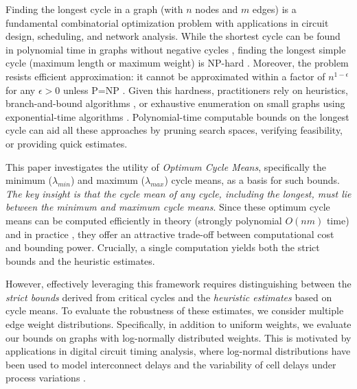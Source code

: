 \documentclass{article}
\theoremstyle{definition}
\begin{document}
Finding the longest cycle in a graph (with $n$ nodes and $m$ edges) is
a fundamental combinatorial optimization problem with applications in
circuit design, scheduling, and network analysis. While the shortest
cycle can be found in polynomial time in graphs without negative
cycles \citep{OrSe2017}, finding the
longest simple cycle (maximum length or maximum weight) is NP-hard
\citep{Ga79}. Moreover, the problem resists efficient approximation:
it cannot be approximated within a factor of $n^{1-\epsilon}$ for any
$\epsilon > 0$ unless P=NP \citep{BjHuKh04}. Given this hardness,
practitioners rely on heuristics, branch-and-bound algorithms
\citep{MoJaSaSe16,StPuFe14,CoStFe20}, or exhaustive enumeration on
small graphs using exponential-time algorithms
\citep{Jo75,HaJa08,BaSa25}. Polynomial-time computable bounds on the
longest cycle can aid all these approaches by pruning search spaces,
verifying feasibility, or providing quick estimates.

This paper investigates the utility of \textit{Optimum Cycle Means},
specifically the minimum ($\lambda_{min}$) and maximum
($\lambda_{max}$) cycle means, as a basis for such bounds. \textit{The
  key insight is that the cycle mean of any cycle, including the
  longest, must lie between the minimum and maximum cycle
  means}. Since these optimum cycle means can be computed efficiently
in theory (strongly polynomial $O(nm)$ time) and in practice
\citep{Da04}, they offer an attractive trade-off between computational
cost and bounding power. Crucially, a single computation yields both
the strict bounds and the heuristic estimates.

However, effectively leveraging this framework requires distinguishing
between the \textit{strict bounds} derived from critical cycles and
the \textit{heuristic estimates} based on cycle means. To evaluate the
robustness of these estimates, we consider multiple edge weight
distributions. Specifically, in addition to uniform weights, we
evaluate our bounds on graphs with log-normally distributed
weights. This is motivated by applications in digital circuit timing
analysis, where log-normal distributions have been used to model
interconnect delays \citep{AlLiKa03} and the variability of cell
delays under process variations \citep{KiHaPa16}.
\end{document}
